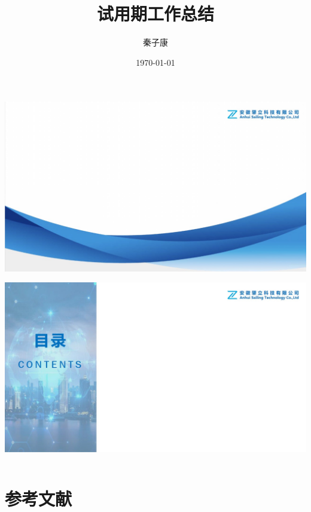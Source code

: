 \documentclass{beamer}
\author{秦子康}
\title{试用期工作总结}
\institute{安徽肇立科技有限公司}
\date{\today}
\begin{document}
\kaishu

{
    {
        \includegraphics[width=\paperwidth,height=\paperheight]{pic/front_page.jpg}
    }
    \begin{frame}
        \titlepage
    \end{frame}
}

{
    {
        \includegraphics[width=\paperwidth,height=\paperheight]{pic/outline_page.jpg}
    }
    \begin{frame}
        \begin{columns}
            \tableofcontents[sectionstyle=show,subsectionstyle=show/shaded/hide,subsubsectionstyle=show/shaded/hide]
        \end{columns}
    \end{frame}
}







\section{参考文献}
\end{document}

